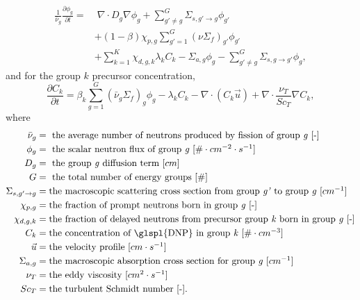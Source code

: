 \begin{equation}
    \begin{split}
    \frac{1}{\bar{\nu}_g} \frac{\partial \phi_g}{\partial t} = & \; \nabla \cdot D_g \nabla \phi_g + \sum_{g' \neq g}^G \Sigma_{s, g' \rightarrow g} \phi_{g'} \\
    & + (1-\beta) \chi_{p, g} \sum_{g'=1}^{G} (\nu \Sigma_f)_{g'} \phi_{g'}\\
    & + \sum_{k=1}^K \chi_{d, g, k} \lambda_k C_k - \Sigma_{a, g} \phi_g - \sum_{g' \neq g}^G \Sigma_{s, g \rightarrow g'} \phi_{g},
    \label{eq:mg-n-diff}
    \end{split}
\end{equation}
and for the group $k$ precursor concentration,
\begin{equation}
    \frac{\partial C_k}{\partial t} = \beta_k \sum_{g=1}^G (\bar{\nu}_g \Sigma_f)_g \phi_g - \lambda_k C_k - \nabla \cdot (C_k \vec{u}) + \nabla \cdot \frac{\nu_T}{Sc_T} \nabla C_k,
    \label{eq:mg-n-diff-Ci}
\end{equation}
where
\begin{align}
\bar{\nu}_g &= \mbox{ the average number of neutrons produced by fission of group \textit{g} [-]} \nonumber\\
\phi_g &= \mbox{ the scalar neutron flux of group \textit{g} [$\# \cdot cm^{-2} \cdot s^{-1}$]} \nonumber\\
D_g &=\mbox{ the group \textit{g} diffusion term [$cm$]}\nonumber\\
G &= \mbox{ the total number of energy groups [$\#$]} \nonumber\\
\Sigma_{s, g' \rightarrow g} &= \mbox{the macroscopic scattering cross section from group \textit{g'} to group \textit{g} [$cm^{-1}$]} \nonumber\\
\chi_{p, g} &= \mbox{the fraction of prompt neutrons born in group \textit{g} [-]} \nonumber\\
\chi_{d, g, k} &= \mbox{the fraction of delayed neutrons from precursor group \textit{k} born in group \textit{g} [-]} \nonumber\\
C_k &= \mbox{the concentration of \glspl{DNP} in group \textit{k} [$\# \cdot cm^{-3}$]} \nonumber\\
\vec{u} &= \mbox{the velocity profile [$cm \cdot s^{-1}$]} \nonumber\\
\Sigma_{a, g} &= \mbox{the macroscopic absorption cross section for group \textit{g} $[cm^{-1}]$} \nonumber\\
\nu_T &= \mbox{the eddy viscosity [$cm^2 \cdot s^{-1}$]} \nonumber\\
Sc_T &= \mbox{the turbulent Schmidt number [-].} \nonumber
\end{align}

